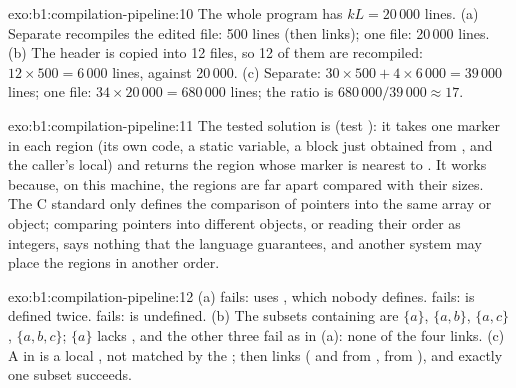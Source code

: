 \begin{solution}{exo:b1:compilation-pipeline:10}
The whole program has $kL = 20\,000$ lines. (a) Separate  recompiles the edited file: 500 lines (then
links); one file: 20\,000 lines. (b) The header is copied into 12 files, so 12 of them are recompiled:
$12 \times 500 = 6\,000$ lines, against 20\,000. (c) Separate: $30 \times 500 + 4 \times 6\,000 = 39\,000$ lines;
one file: $34 \times 20\,000 = 680\,000$ lines; the ratio is $680\,000 / 39\,000 \approx 17$.
\end{solution}

\begin{solution}{exo:b1:compilation-pipeline:11}
The tested solution is  (test ): it takes one marker in
each region (its own code, a static variable, a block just obtained from , and the caller's local)
and returns the region whose marker is nearest to .
It works because, on this machine, the regions are far apart compared with their sizes. The C standard only
defines the comparison of pointers into the same array or object; comparing pointers into different objects, or
reading their order as integers, says nothing that the language guarantees, and another system may place the
regions in another order.
\end{solution}

\begin{solution}{exo:b1:compilation-pipeline:12}
(a)  fails:  uses , which nobody defines.  fails:
 is defined twice.  fails:  is undefined. (b) The subsets containing
 are $\{a\}$, $\{a,b\}$, $\{a,c\}$, $\{a,b,c\}$; $\{a\}$ lacks , and the other three fail as in
(a): none of the four links. (c) A   in  is a local , not matched by the
; then  links ( and  from ,  from ),
and exactly one subset succeeds.
\end{solution}


